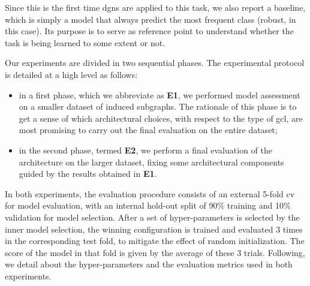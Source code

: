 Since this is the first time \glspl{dgn} are applied to this task, we also report a baseline, which is simply a model that always predict the most frequent class (robust, in this case). Its purpose is to serve as reference point to understand whether the task is being learned to some extent or not.

Our experiments are divided in two sequential phases. The experimental protocol is detailed at a high level as follows:
\begin{itemize}
    \item in a first phase, which we abbreviate as \textbf{E1}, we performed model assessment on a smaller dataset of induced subgraphs. The rationale of this phase is to get a sense of which architectural choices, \eg with respect to the type of \gls{gcl}, are most promising to carry out the final evaluation on the entire dataset;
    \item in the second phase, termed \textbf{E2}, we perform a final evaluation of the architecture on the larger dataset, fixing some architectural components guided by the results obtained in \textbf{E1}.
\end{itemize}
In both experiments, the evaluation procedure consists of an external 5-fold \gls{cv} for model evaluation, with an internal hold-out split of 90\% training and 10\% validation for model selection. After a set of hyper-parameters is selected by the inner model selection, the winning configuration is trained and evaluated 3 times in the corresponding test fold, to mitigate the effect of random initialization. The score of the model in that fold is given by the average of these 3 trials. Following, we detail about the hyper-parameters and the evaluation metrics used in both experiments.

